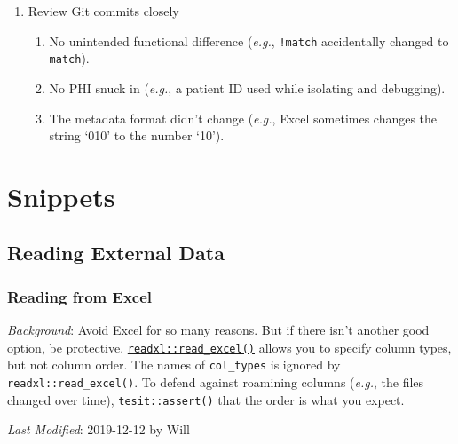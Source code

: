 \documentclass[
]{book}
\providecommand{\tightlist}{%
  \setlength{\itemsep}{0pt}\setlength{\parskip}{0pt}}
\begin{document}
\begin{enumerate}
\def\labelenumi{\arabic{enumi}.}
\tightlist
\item
  Review Git commits closely

  \begin{enumerate}
  \def\labelenumii{\arabic{enumii}.}
  \tightlist
  \item
    No unintended functional difference (\emph{e.g.}, \texttt{!match} accidentally changed to \texttt{match}).
  \item
    No PHI snuck in (\emph{e.g.}, a patient ID used while isolating and debugging).
  \item
    The metadata format didn't change (\emph{e.g.}, Excel sometimes changes the string `010' to the number `10').
  \end{enumerate}
\end{enumerate}

\hypertarget{snippets}{%
\chapter{Snippets}\label{snippets}}

\hypertarget{reading-external-data}{%
\section{Reading External Data}\label{reading-external-data}}

\hypertarget{reading-from-excel}{%
\subsection{Reading from Excel}\label{reading-from-excel}}

\emph{Background}: Avoid Excel for so many reasons. But if there isn't another good option, be protective. \href{https://readxl.tidyverse.org/reference/read_excel.html}{\texttt{readxl::read\_excel()}} allows you to specify column types, but not column order. The names of \texttt{col\_types} is ignored by \texttt{readxl::read\_excel()}. To defend against roamining columns (\emph{e.g.}, the files changed over time), \texttt{tesit::assert()} that the order is what you expect.

\emph{Last Modified}: 2019-12-12 by Will
\end{document}
